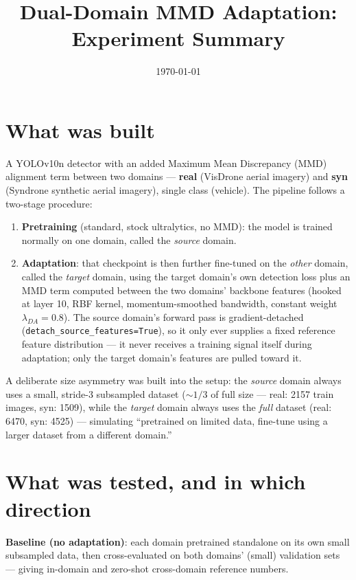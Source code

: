 \documentclass[11pt]{article}
\title{Dual-Domain MMD Adaptation: Experiment Summary}
\author{}
\date{\today}
\begin{document}
\maketitle

\section{What was built}

A YOLOv10n detector with an added Maximum Mean Discrepancy (MMD) alignment term between two
domains --- \textbf{real} (VisDrone aerial imagery) and \textbf{syn} (Syndrone synthetic aerial
imagery), single class (vehicle). The pipeline follows a two-stage procedure:

\begin{enumerate}
    \item \textbf{Pretraining} (standard, stock ultralytics, no MMD): the model is trained
    normally on one domain, called the \emph{source} domain.
    \item \textbf{Adaptation}: that checkpoint is then further fine-tuned on the \emph{other}
    domain, called the \emph{target} domain, using the target domain's own detection loss plus an
    MMD term computed between the two domains' backbone features (hooked at layer 10, RBF
    kernel, momentum-smoothed bandwidth, constant weight $\lambda_{DA}=0.8$). The source domain's
    forward pass is gradient-detached (\texttt{detach\_source\_features=True}), so it only ever
    supplies a fixed reference feature distribution --- it never receives a training signal
    itself during adaptation; only the target domain's features are pulled toward it.
\end{enumerate}

A deliberate size asymmetry was built into the setup: the \emph{source} domain always uses a
small, stride-3 subsampled dataset ($\sim\!1/3$ of full size --- real: 2157 train images, syn:
1509), while the \emph{target} domain always uses the \emph{full} dataset (real: 6470, syn: 4525)
--- simulating ``pretrained on limited data, fine-tune using a larger dataset from a different
domain.''

\section{What was tested, and in which direction}

\textbf{Baseline (no adaptation)}: each domain pretrained standalone on its own small
subsampled data, then cross-evaluated on both domains' (small) validation sets --- giving
in-domain and zero-shot cross-domain reference numbers.
\end{document}

